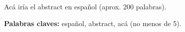 \chapter*{\runtitulo}

\noindent Acá iría el abstract en español (aprox. 200 palabras).

\bigskip

\noindent\textbf{Palabras claves:} español, abstract, acá (no menos de 5).
